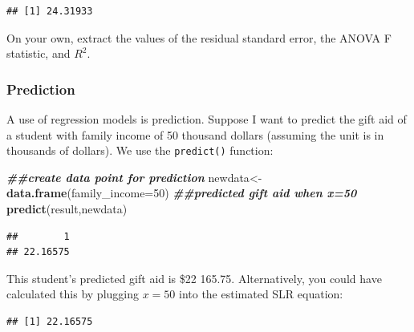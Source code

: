 \documentclass[
]{book}
\newenvironment{Shaded}{\begin{snugshade}}{\end{snugshade}}
\newcommand{\AttributeTok}[1]{\textcolor[rgb]{0.13,0.29,0.53}{#1}}
\newcommand{\DecValTok}[1]{\textcolor[rgb]{0.00,0.00,0.81}{#1}}
\newcommand{\DocumentationTok}[1]{\textcolor[rgb]{0.56,0.35,0.01}{\textbf{\textit{#1}}}}
\newcommand{\FunctionTok}[1]{\textcolor[rgb]{0.13,0.29,0.53}{\textbf{#1}}}
\newcommand{\NormalTok}[1]{#1}
\newcommand{\OtherTok}[1]{\textcolor[rgb]{0.56,0.35,0.01}{#1}}
\newcommand{\SpecialCharTok}[1]{\textcolor[rgb]{0.81,0.36,0.00}{\textbf{#1}}}
\begin{document}
\begin{verbatim}
## [1] 24.31933
\end{verbatim}

On your own, extract the values of the residual standard error, the ANOVA F statistic, and \(R^2\).

\hypertarget{prediction}{%
\subsubsection*{Prediction}\label{prediction}}

A use of regression models is prediction. Suppose I want to predict the gift aid of a student with family income of 50 thousand dollars (assuming the unit is in thousands of dollars). We use the \texttt{predict()} function:

\begin{Shaded}
\begin{Highlighting}[]
\DocumentationTok{\#\#create data point for prediction}
\NormalTok{newdata}\OtherTok{\textless{}{-}}\FunctionTok{data.frame}\NormalTok{(}\AttributeTok{family\_income=}\DecValTok{50}\NormalTok{)}
\DocumentationTok{\#\#predicted gift aid when x=50}
\FunctionTok{predict}\NormalTok{(result,newdata)}
\end{Highlighting}
\end{Shaded}

\begin{verbatim}
##        1 
## 22.16575
\end{verbatim}

This student's predicted gift aid is \$22 165.75. Alternatively, you could have calculated this by plugging \(x=50\) into the estimated SLR equation:

\begin{Shaded}
\end{Shaded}

\begin{verbatim}
## [1] 22.16575
\end{verbatim}
\end{document}
